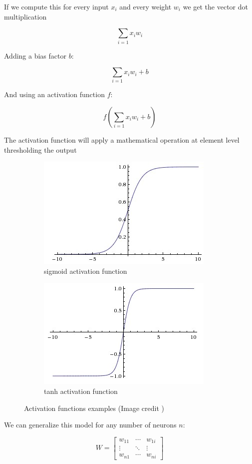 If we compute this for every input $x_i$ and every weight $w_i$ we get the vector dot multiplication

$$ \sum_{i=1} x_i w_i  $$ 

Adding a bias factor $b$:

$$ \sum_{i=1} x_i w_i  + b$$ 

And using an activation function $f$:

$$ f(\sum_{i=1} x_i w_i + b)  $$ 

The activation function will apply a mathematical operation at element level thresholding the output

\begin{figure}
    \centering
    \begin{subfigure}{.5\textwidth}
        \centering
        \includegraphics[width=.4\linewidth]{Figures/sigmoid}
        \caption{sigmoid activation function}
        \label{fig:sub1}
    \end{subfigure}%
    \begin{subfigure}{.5\textwidth}
        \centering
        \includegraphics[width=.4\linewidth]{Figures/tanh}
        \caption{tanh activation function}
        \label{fig:sub2}
    \end{subfigure}
    \caption{Activation functions examples (Image credit \cite{cs231n})}
    \label{fig:activations}
\end{figure}



We can generalize this model for any number of neurons $n$:

$$
W=\left[
\begin{array}{ccc}
   w_{11} & \cdots & w_{1i} \\
   \vdots & \ddots & \vdots \\
   w_{n1} & \cdots & w_{ni}
\end{array}
\right]
$$


